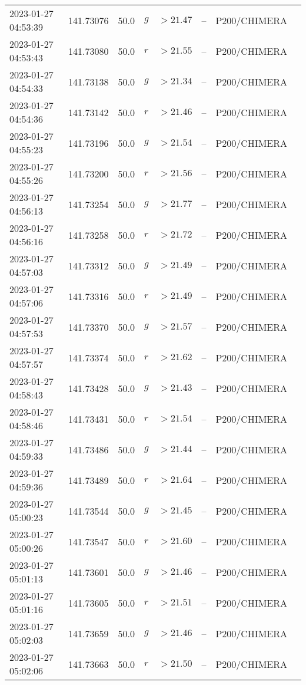 \documentclass{nature_plusfigure}
\begin{document}
\begin{supplement}
\begin{center}
\begin{longtable}{llllllll}
2023-01-27 04:53:39 & 141.73076 & 50.0 & $g$ & $>21.47$ & -- & P200/CHIMERA &  \\ 
2023-01-27 04:53:43 & 141.73080 & 50.0 & $r$ & $>21.55$ & -- & P200/CHIMERA &  \\ 
2023-01-27 04:54:33 & 141.73138 & 50.0 & $g$ & $>21.34$ & -- & P200/CHIMERA &  \\ 
2023-01-27 04:54:36 & 141.73142 & 50.0 & $r$ & $>21.46$ & -- & P200/CHIMERA &  \\ 
2023-01-27 04:55:23 & 141.73196 & 50.0 & $g$ & $>21.54$ & -- & P200/CHIMERA &  \\ 
2023-01-27 04:55:26 & 141.73200 & 50.0 & $r$ & $>21.56$ & -- & P200/CHIMERA &  \\ 
2023-01-27 04:56:13 & 141.73254 & 50.0 & $g$ & $>21.77$ & -- & P200/CHIMERA &  \\ 
2023-01-27 04:56:16 & 141.73258 & 50.0 & $r$ & $>21.72$ & -- & P200/CHIMERA &  \\ 
2023-01-27 04:57:03 & 141.73312 & 50.0 & $g$ & $>21.49$ & -- & P200/CHIMERA &  \\ 
2023-01-27 04:57:06 & 141.73316 & 50.0 & $r$ & $>21.49$ & -- & P200/CHIMERA &  \\ 
2023-01-27 04:57:53 & 141.73370 & 50.0 & $g$ & $>21.57$ & -- & P200/CHIMERA &  \\ 
2023-01-27 04:57:57 & 141.73374 & 50.0 & $r$ & $>21.62$ & -- & P200/CHIMERA &  \\ 
2023-01-27 04:58:43 & 141.73428 & 50.0 & $g$ & $>21.43$ & -- & P200/CHIMERA &  \\ 
2023-01-27 04:58:46 & 141.73431 & 50.0 & $r$ & $>21.54$ & -- & P200/CHIMERA &  \\ 
2023-01-27 04:59:33 & 141.73486 & 50.0 & $g$ & $>21.44$ & -- & P200/CHIMERA &  \\ 
2023-01-27 04:59:36 & 141.73489 & 50.0 & $r$ & $>21.64$ & -- & P200/CHIMERA &  \\ 
2023-01-27 05:00:23 & 141.73544 & 50.0 & $g$ & $>21.45$ & -- & P200/CHIMERA &  \\ 
2023-01-27 05:00:26 & 141.73547 & 50.0 & $r$ & $>21.60$ & -- & P200/CHIMERA &  \\ 
2023-01-27 05:01:13 & 141.73601 & 50.0 & $g$ & $>21.46$ & -- & P200/CHIMERA &  \\ 
2023-01-27 05:01:16 & 141.73605 & 50.0 & $r$ & $>21.51$ & -- & P200/CHIMERA &  \\ 
2023-01-27 05:02:03 & 141.73659 & 50.0 & $g$ & $>21.46$ & -- & P200/CHIMERA &  \\ 
2023-01-27 05:02:06 & 141.73663 & 50.0 & $r$ & $>21.50$ & -- & P200/CHIMERA &  \\ 

\end{longtable}
\end{center}
\end{supplement}
\end{document}

